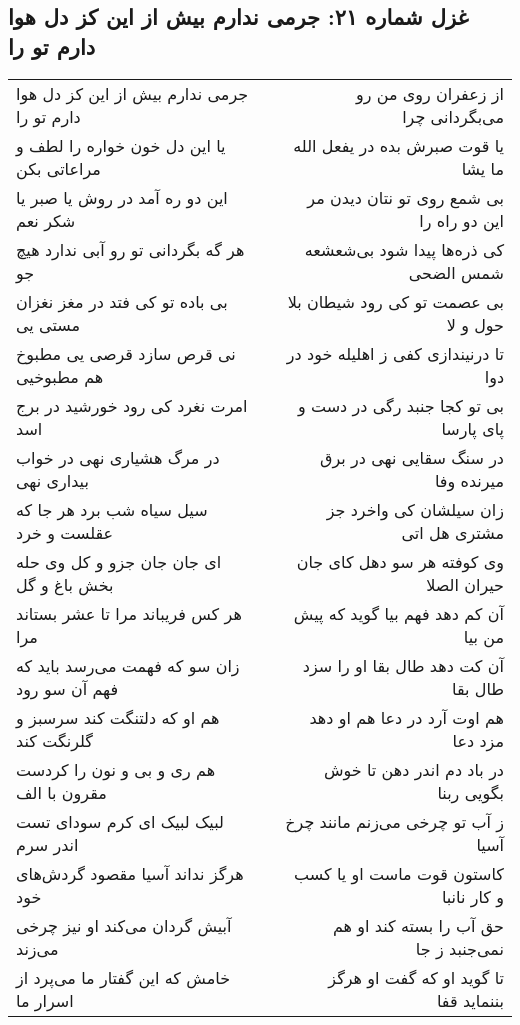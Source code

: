 \begin{center}
\section*{غزل شماره ۲۱: جرمی ندارم بیش از این کز دل هوا دارم تو را}
\label{sec:0021}
\begin{longtable}{l p{0.5cm} r}
جرمی ندارم بیش از این کز دل هوا دارم تو را
&&
از زعفران روی من رو می‌بگردانی چرا
\\
یا این دل خون خواره را لطف و مراعاتی بکن
&&
یا قوت صبرش بده در یفعل الله ما یشا
\\
این دو ره آمد در روش یا صبر یا شکر نعم
&&
بی شمع روی تو نتان دیدن مر این دو راه را
\\
هر گه بگردانی تو رو آبی ندارد هیچ جو
&&
کی ذره‌ها پیدا شود بی‌شعشعه شمس الضحی
\\
بی باده تو کی فتد در مغز نغزان مستی یی
&&
بی عصمت تو کی رود شیطان بلا حول و لا
\\
نی قرص سازد قرصی یی مطبوخ هم مطبوخیی
&&
تا درنیندازی کفی ز اهلیله خود در دوا
\\
امرت نغرد کی رود خورشید در برج اسد
&&
بی تو کجا جنبد رگی در دست و پای پارسا
\\
در مرگ هشیاری نهی در خواب بیداری نهی
&&
در سنگ سقایی نهی در برق میرنده وفا
\\
سیل سیاه شب برد هر جا که عقلست و خرد
&&
زان سیلشان کی واخرد جز مشتری هل اتی
\\
ای جان جان جزو و کل وی حله بخش باغ و گل
&&
وی کوفته هر سو دهل کای جان حیران الصلا
\\
هر کس فریباند مرا تا عشر بستاند مرا
&&
آن کم دهد فهم بیا گوید که پیش من بیا
\\
زان سو که فهمت می‌رسد باید که فهم آن سو رود
&&
آن کت دهد طال بقا او را سزد طال بقا
\\
هم او که دلتنگت کند سرسبز و گلرنگت کند
&&
هم اوت آرد در دعا هم او دهد مزد دعا
\\
هم ری و بی و نون را کردست مقرون با الف
&&
در باد دم اندر دهن تا خوش بگویی ربنا
\\
لبیک لبیک ای کرم سودای تست اندر سرم
&&
ز آب تو چرخی می‌زنم مانند چرخ آسیا
\\
هرگز نداند آسیا مقصود گردش‌های خود
&&
کاستون قوت ماست او یا کسب و کار نانبا
\\
آبیش گردان می‌کند او نیز چرخی می‌زند
&&
حق آب را بسته کند او هم نمی‌جنبد ز جا
\\
خامش که این گفتار ما می‌پرد از اسرار ما
&&
تا گوید او که گفت او هرگز بننماید قفا
\\
\end{longtable}
\end{center}
